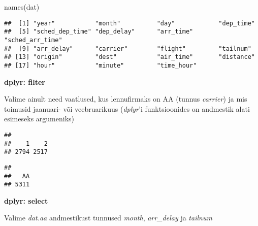 \documentclass[
]{book}
\newenvironment{Shaded}{\begin{snugshade}}{\end{snugshade}}
\newcommand{\DecValTok}[1]{\textcolor[rgb]{0.00,0.00,0.81}{#1}}
\newcommand{\FunctionTok}[1]{\textcolor[rgb]{0.00,0.00,0.00}{#1}}
\newcommand{\NormalTok}[1]{#1}
\newcommand{\OtherTok}[1]{\textcolor[rgb]{0.56,0.35,0.01}{#1}}
\newcommand{\SpecialCharTok}[1]{\textcolor[rgb]{0.00,0.00,0.00}{#1}}
\newcommand{\StringTok}[1]{\textcolor[rgb]{0.31,0.60,0.02}{#1}}
\begin{document}
\begin{Shaded}
\begin{Highlighting}[]
\FunctionTok{names}\NormalTok{(dat)}
\end{Highlighting}
\end{Shaded}

\begin{verbatim}
##  [1] "year"           "month"          "day"            "dep_time"      
##  [5] "sched_dep_time" "dep_delay"      "arr_time"       "sched_arr_time"
##  [9] "arr_delay"      "carrier"        "flight"         "tailnum"       
## [13] "origin"         "dest"           "air_time"       "distance"      
## [17] "hour"           "minute"         "time_hour"
\end{verbatim}

\textbf{dplyr: filter}

Valime ainult need vaatlused, kus lennufirmaks on AA (tunnus \emph{carrier}) ja mis toimusid jaanuari- või veebruarikuus (\emph{dplyr}'i funktsioonides on andmestik alati esimeseks argumeniks)

\begin{Shaded}
\end{Shaded}

\begin{verbatim}
## 
##    1    2 
## 2794 2517
\end{verbatim}

\begin{Shaded}
\end{Shaded}

\begin{verbatim}
## 
##   AA 
## 5311
\end{verbatim}

\textbf{dplyr: select}

Valime \emph{dat.aa} andmestikust tunnused \emph{month}, \emph{arr\_delay} ja \emph{tailnum}
\end{document}
